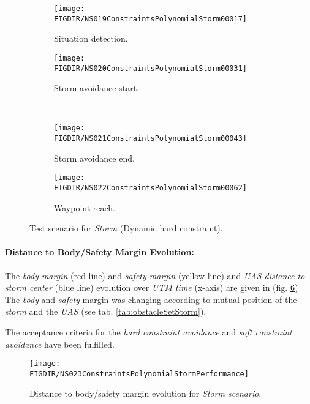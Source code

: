     \begin{figure}[H]
        \centering
        \begin{subfigure}{0.48\textwidth}
        	\centering
            \texttt{[image: \\FIGDIR/NS019ConstraintsPolynomialStorm00017]}
            \caption{Situation detection.}
            \label{fig:stromSituationDetection}
        \end{subfigure}
        \begin{subfigure}{0.48\textwidth}
        	\centering
            \texttt{[image: \\FIGDIR/NS020ConstraintsPolynomialStorm00031]} 
            \caption{Storm avoidance start.}
            \label{fig:stormAvoidanceStart}
        \end{subfigure}
        \\
        \begin{subfigure}{0.48\textwidth}
        	\centering
            \texttt{[image: \\FIGDIR/NS021ConstraintsPolynomialStorm00043]} 
            \caption{Storm avoidance end.}
            \label{fig:stormAvoidanceEnd}
        \end{subfigure}
        \begin{subfigure}{0.48\textwidth}
        	\centering
            \texttt{[image: \\FIGDIR/NS022ConstraintsPolynomialStorm00062]} 
            \caption{Waypoint reach.}
            \label{fig:stormWaypointReach}
        \end{subfigure}
        \caption{Test scenario for \emph{Storm} (Dynamic hard constraint). }
        \label{fig:testCaseStormAvoidance}
    \end{figure}
    
    \paragraph{Distance to Body/Safety Margin Evolution:} The \emph{body margin} (red line) and \emph{safety margin} (yellow line) and \emph{UAS distance to storm center} (blue line) evolution over \emph{UTM time} (x-axis) are given in (fig. \ref{fig:testCaseStormAvoidancePerformance}) The \emph{body} and \emph{safety} margin was changing according to mutual position of the \emph{storm} and the \emph{UAS} (see tab. \ref{tab:obstacleSetStorm}). 
    
    The acceptance criteria for the \emph{hard constraint avoidance} and \emph{soft constraint avoidance} have been fulfilled. 
    
    \begin{figure}[H]
        \centering
        \texttt{[image: \\FIGDIR/NS023ConstraintsPolynomialStormPerformance]} 
        \caption{Distance to body/safety margin evolution for \emph{Storm scenario}.}
        \label{fig:testCaseStormAvoidancePerformance}
    \end{figure}
    
